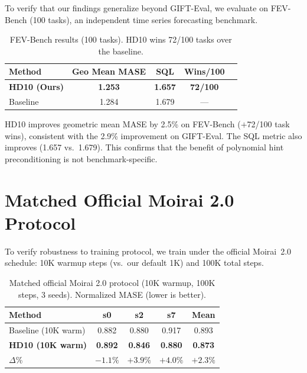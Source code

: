 \documentclass{article}
\begin{document}
To verify that our findings generalize beyond GIFT-Eval, we evaluate on FEV-Bench (100 tasks), an independent time series forecasting benchmark.

\begin{table}[h]
\centering
\caption{FEV-Bench results (100 tasks). HD10 wins 72/100 tasks over the baseline.}
\small
\begin{tabular}{lcccc}
\toprule
\textbf{Method} & \textbf{Geo Mean MASE} & \textbf{SQL} & \textbf{Wins/100} \\
\midrule
\textbf{HD10 (Ours)} & \textbf{1.253} & \textbf{1.657} & \textbf{72/100} \\
Baseline & 1.284 & 1.679 & --- \\
\bottomrule
\end{tabular}
\end{table}

HD10 improves geometric mean MASE by 2.5\% on FEV-Bench ($+$72/100 task wins), consistent with the 2.9\% improvement on GIFT-Eval. The SQL metric also improves (1.657 vs.\ 1.679). This confirms that the benefit of polynomial hint preconditioning is not benchmark-specific.

\section{Matched Official Moirai 2.0 Protocol}
\label{app:official_protocol}

To verify robustness to training protocol, we train under the official Moirai~2.0 schedule: 10K warmup steps (vs.\ our default 1K) and 100K total steps.

\begin{table}[h]
\centering
\caption{Matched official Moirai 2.0 protocol (10K warmup, 100K steps, 3 seeds). Normalized MASE (lower is better).}
\small
\begin{tabular}{lcccc}
\toprule
\textbf{Method} & \textbf{s0} & \textbf{s2} & \textbf{s7} & \textbf{Mean} \\
\midrule
Baseline (10K warm) & 0.882 & 0.880 & 0.917 & 0.893 \\
\textbf{HD10 (10K warm)} & \textbf{0.892} & \textbf{0.846} & \textbf{0.880} & \textbf{0.873} \\
\midrule
$\Delta$\% & $-1.1\%$ & $+3.9\%$ & $+4.0\%$ & $+2.3\%$ \\
\bottomrule
\end{tabular}
\end{table}
\end{document}
